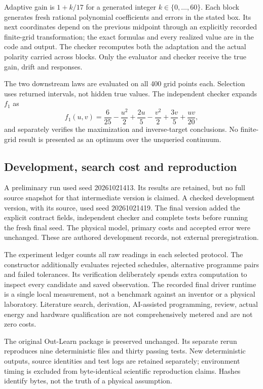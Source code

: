 \documentclass[11pt,letterpaper]{article}
\theoremstyle{definition}\newtheorem{definition}[theorem]{Definition}
\theoremstyle{remark}\newtheorem{remark}[theorem]{Remark}
\begin{document}
Adaptive gain is $1+k/17$ for a generated integer $k\in\{0,\ldots,60\}$. Each block generates fresh rational polynomial coefficients and errors in the stated box. Its next coordinates depend on the previous midpoint through an explicitly recorded finite-grid transformation; the exact formulas and every realized value are in the code and output. The checker recomputes both the adaptation and the actual polarity carried across blocks. Only the evaluator and checker receive the true gain, drift and responses.

The two downstream laws are evaluated on all 400 grid points each. Selection uses returned intervals, not hidden true values. The independent checker expands $f_1$ as
\begin{equation}
 f_1(u,v)=\frac6{25}-\frac{u^2}{2}+\frac{2u}{5}-\frac{v^2}{2}+\frac{3v}{5}+\frac{uv}{20},
\end{equation}
and separately verifies the maximization and inverse-target conclusions. No finite-grid result is presented as an optimum over the unqueried continuum.

\subsection{Development, search cost and reproduction}
A preliminary run used seed 20261021413. Its results are retained, but no full source snapshot for that intermediate version is claimed. A checked development version, with its source, used seed 20261021419. The final version added the explicit contract fields, independent checker and complete tests before running the fresh final seed. The physical model, primary costs and accepted error were unchanged. These are authored development records, not external preregistration.

The experiment ledger counts all raw readings in each selected protocol. The constructor additionally evaluates rejected schedules, alternative programme pairs and failed tolerances. Its verification deliberately spends extra computation to inspect every candidate and saved observation. The recorded final driver runtime is a single local measurement, not a benchmark against an inventor or a physical laboratory. Literature search, derivation, AI-assisted programming, review, actual energy and hardware qualification are not comprehensively metered and are not zero costs.

The original Out-Learn package is preserved unchanged. Its separate rerun reproduces nine deterministic files and thirty passing tests. New deterministic outputs, source identities and test logs are retained separately; environment timing is excluded from byte-identical scientific reproduction claims. Hashes identify bytes, not the truth of a physical assumption.
\end{document}
